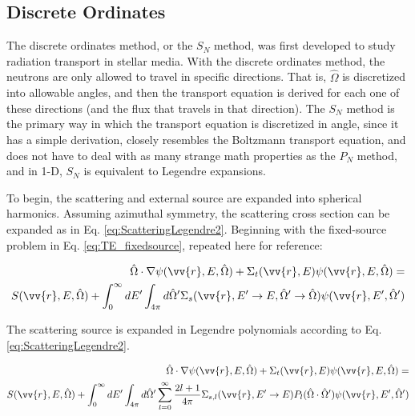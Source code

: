 \documentclass[10pt]{article}
\begin{document}
\begin{flushleft}
\subsection{Discrete Ordinates}
The discrete ordinates method, or the \(S_N\) method, was first developed to study radiation transport in stellar media. With the discrete ordinates method, the neutrons are only allowed to travel in specific directions. That is, \(\hat{\Omega}\) is discretized into allowable angles, and then the transport equation is derived for each one of these directions (and the flux that travels in that direction). The \(S_N\) method is the primary way in which the transport equation is discretized in angle, since it has a simple derivation, closely resembles the Boltzmann transport equation, and does not have to deal with as many strange math properties as the \(P_N\) method, and in 1-D, \(S_N\) is equivalent to Legendre expansions. 

To begin, the scattering and external source are expanded into spherical harmonics. Assuming azimuthal symmetry, the scattering cross section can be expanded as in Eq. \eqref{eq:ScatteringLegendre2}. Beginning with the fixed-source problem in Eq. \eqref{eq:TE_fixedsource}, repeated here for reference:

\begin{equation*}
\begin{aligned}
 \hat{\Omega}\cdot\nabla\psi(\vv{r}, E, \hat{\Omega}) + 
 \Sigma_t(\vv{r},E)\psi(\vv{r}, E, \hat{\Omega}) = \\
S(\vv{r}, E, \hat{\Omega}) + \int_{0}^{\infty}dE' \int_{4\pi}^{ } d\hat{\Omega}' \Sigma_s(\vv{r}, E'\rightarrow E, \hat{\Omega}'\rightarrow\hat{\Omega})\psi(\vv{r}, E', \hat{\Omega}')\\
\end{aligned}
\end{equation*}

The scattering source is expanded in Legendre polynomials according to Eq. \eqref{eq:ScatteringLegendre2}.

\begin{equation}
\begin{aligned}
 \hat{\Omega}\cdot\nabla\psi(\vv{r}, E, \hat{\Omega}) + 
 \Sigma_t(\vv{r},E)\psi(\vv{r}, E, \hat{\Omega}) = \\
S(\vv{r}, E, \hat{\Omega}) + \int_{0}^{\infty}dE' \int_{4\pi}^{ } d\hat{\Omega}' \sum_{l=0}^{\infty}\frac{2l+1}{4\pi}\Sigma_{s,l}(\vv{r}, E'\rightarrow E)P_l(\hat{\Omega}\cdot\hat{\Omega}')\psi(\vv{r}, E', \hat{\Omega}')\\
\end{aligned}
\end{equation}


\end{flushleft}
\end{document}
